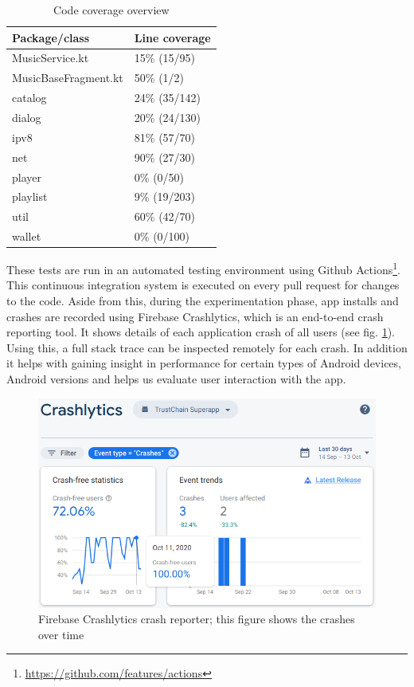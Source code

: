 \begin{table}[]
\begin{tabular}{|l|l|}
\hline
\textbf{Package/class} & \textbf{Line coverage} \\ \hline
MusicService.kt        & 15\% (15/95)           \\ \hline
MusicBaseFragment.kt   & 50\% (1/2)             \\ \hline
catalog                & 24\% (35/142)          \\ \hline
dialog                 & 20\% (24/130)          \\ \hline
ipv8                   & 81\% (57/70)           \\ \hline
net                    & 90\% (27/30)           \\ \hline
player                 & 0\% (0/50)             \\ \hline
playlist               & 9\% (19/203)           \\ \hline
util                   & 60\% (42/70)           \\ \hline
wallet                 & 0\% (0/100)            \\ \hline
\end{tabular}
\caption{Code coverage overview}
\label{tab:code-cov}
\end{table}

These tests are run in an automated testing environment using Github Actions\footnote{\url{https://github.com/features/actions}}. This continuous integration system is executed on every pull request for changes to the code. Aside from this, during the experimentation phase, app installs and crashes are recorded using Firebase Crashlytics, which is an end-to-end crash reporting tool. It shows details of each application crash of all users (see fig. \ref{fig:firebase-crashlytics}). Using this, a full stack trace can be inspected remotely for each crash. In addition it helps with gaining insight in performance for certain types of Android devices, Android versions and helps us evaluate user interaction with the app. 

\begin{figure}
    \includegraphics[width=0.8\linewidth]{implementation/firebase-crashlytics.png}
    \caption{Firebase Crashlytics crash reporter; this figure shows the crashes over time}
    \label{fig:firebase-crashlytics}
\end{figure}